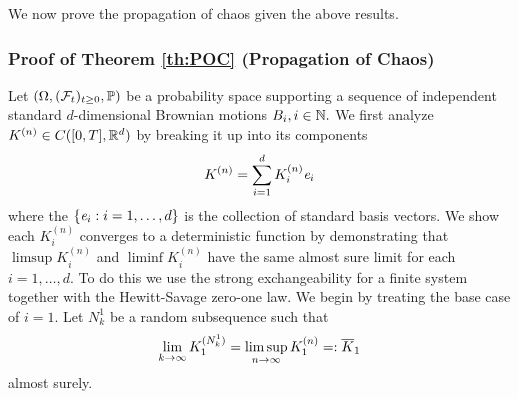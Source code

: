 We now prove the propagation of chaos given the above results.

\subsubsection*{Proof of Theorem \ref{th:POC} (Propagation of Chaos)}
Let $(\Omega, (\mathcal{F}_t)_{t \geq 0}, \mathbb{P})$ be a probability space supporting a sequence of independent standard $d$-dimensional Brownian motions $B_i, i \in \mathbb{N}.$ We first analyze $K^{(n)}\in C([0, T], \mathbb{R}^d)$ by breaking it up into its components 
\[
K^{(n)}= \sum_{i = 1}^d K^{(n)}_i\mathit{e}_i
\]
where the $\{\mathit{e}_i : i = 1, \dots, d\}$ is the collection of standard basis vectors. We show each $K_i^{(n)}$ converges to a deterministic function
by demonstrating that $\limsup K_i^{(n)}$ and $\liminf K_i^{(n)}$ have the same almost sure limit for each $i = 1, \dots, d.$ To do this we use the strong exchangeability for a finite system together with the Hewitt-Savage zero-one law. We begin by treating the base case of $i = 1$. Let 
$N_k^1$ be a random subsequence such that 
\begin{align}\label{eq:N_k}
	\lim_{k \to \infty} K_1^{(N_k^1)} = \limsup_{n \to \infty} K_1^{(n)} =: \overline{K}_1
\end{align}
almost surely. 

